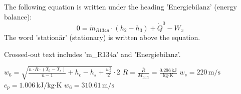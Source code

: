 The following equation is written under the heading 'Energiebilanz' (energy balance):  
\[ 0 = \dot{m}_{R134a} \cdot (h_2 - h_3) + \dot{Q}^0 - W_x \]  
The word 'stationär' (stationary) is written above the equation.  

Crossed-out text includes 'm_R134a' and 'Energiebilanz'.

\( w_6 = \sqrt{\frac{n \cdot R \cdot (T_6 - T_s)}{n - 1} + h_c - h_s + \frac{w_s^2}{2}} \cdot 2 \)  
\( R = \frac{\bar{R}}{M_{\text{Luft}}} = \frac{0.296 \, \text{kJ}}{\text{kg} \cdot \text{K}} \)  
\( w_s = 220 \, \text{m/s} \)  
\( c_p = 1.006 \, \text{kJ/kg·K} \)  
\( w_6 = 310.61 \, \text{m/s} \)